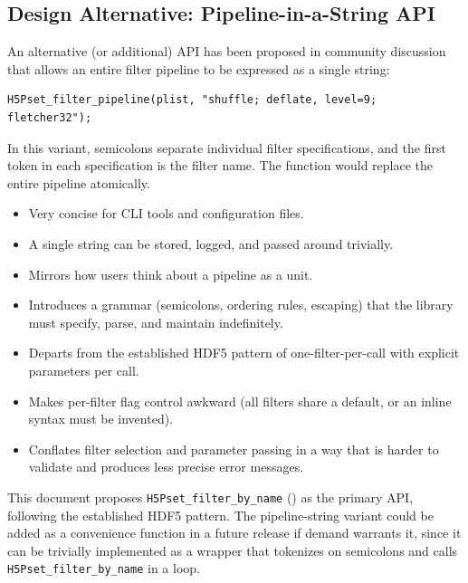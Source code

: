 \documentclass[../HDF5_RFC.tex]{subfiles}
\begin{document}
\subsection{Design Alternative: Pipeline-in-a-String API}
\label{sec:pipeline-string}

An alternative (or additional) API has been proposed in community discussion
that allows an entire filter pipeline to be expressed as a single string:

\begin{verbatim}
H5Pset_filter_pipeline(plist, "shuffle; deflate, level=9; fletcher32");
\end{verbatim}

In this variant, semicolons separate individual filter specifications, and the
first token in each specification is the filter name. The function would
replace the entire pipeline atomically.


\begin{itemize}
\item Very concise for CLI tools and configuration files.
\item A single string can be stored, logged, and passed around trivially.
\item Mirrors how users think about a pipeline as a unit.
\end{itemize}


\begin{itemize}
\item Introduces a grammar (semicolons, ordering rules, escaping) that the
  library must specify, parse, and maintain indefinitely.
\item Departs from the established HDF5 pattern of one-filter-per-call with
  explicit parameters per call.
\item Makes per-filter flag control awkward (all filters share a default, or an
  inline syntax must be invented).
\item Conflates filter selection and parameter passing in a way that is harder to
  validate and produces less precise error messages.
\end{itemize}

This document proposes \texttt{H5Pset\_filter\_by\_name} ()
as the primary API, following the established HDF5 pattern. The
pipeline-string variant could be added as a convenience function in a future
release if demand warrants it, since it can be trivially implemented as a
wrapper that tokenizes on semicolons and calls \texttt{H5Pset\_filter\_by\_name} in a
loop.
\end{document}
